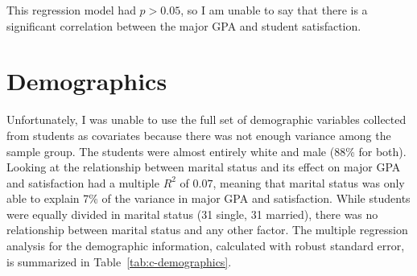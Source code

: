 This regression model had $p>0.05$, so I am unable to say that there is a significant correlation between the major GPA and student satisfaction.

\section{Demographics}
Unfortunately, I was unable to use the full set of demographic variables collected from students as covariates because there was not enough variance among the sample group. The students were almost entirely white and male (88\% for both). Looking at the relationship between marital status and its effect on major GPA and satisfaction had a multiple $R^2$ of $0.07$, meaning that marital status was only able to explain 7\% of the variance in major GPA and satisfaction. While students were equally divided in marital status (31 single, 31 married), there was no relationship between marital status and any other factor. The multiple regression analysis for the demographic information, calculated with robust standard error, is summarized in Table~\ref{tab:c-demographics}.

